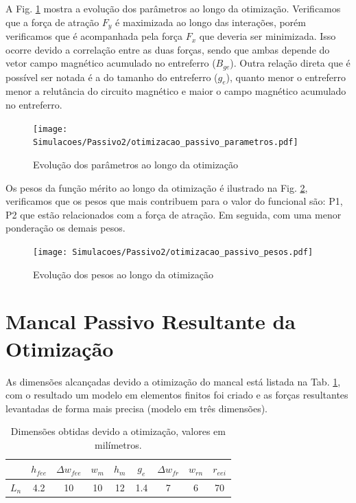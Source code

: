 A Fig. \ref{fig:otimizacao_passivo_parametros} mostra a evolução dos parâmetros ao longo da otimização. Verificamos que a força de atração $F_y$ é maximizada ao longo das interações, porém verificamos que é acompanhada pela força $F_x$ que deveria ser minimizada. Isso ocorre devido a correlação entre as duas forças, sendo que ambas depende do vetor campo magnético acumulado no entreferro ($B_{ge}$). Outra relação direta que é possível ser notada é a do tamanho do entreferro ($g_e$), quanto menor o entreferro menor a relutância do circuito magnético e maior o campo magnético acumulado no entreferro.


\begin{figure}[bh!]
	\centering
	\texttt{[image: Simulacoes/Passivo2/otimizacao\_passivo\_parametros.pdf]}
	\caption{Evolução dos parâmetros ao longo da otimização}
	\label{fig:otimizacao_passivo_parametros}
\end{figure} 

Os pesos da função mérito ao longo da otimização é ilustrado na Fig. \ref{fig:otimizacao_passivo_pesos}, verificamos que os pesos que mais contribuem para o valor do funcional são: P1, P2 que estão relacionados com a força de atração. Em seguida, com uma menor ponderação os demais pesos. 

\begin{figure}[th!]
	\centering
	\texttt{[image: Simulacoes/Passivo2/otimizacao\_passivo\_pesos.pdf]}
	\caption{Evolução dos pesos ao longo da otimização}
	\label{fig:otimizacao_passivo_pesos}
\end{figure} 

\section{Mancal Passivo Resultante da Otimização}

As dimensões alcançadas devido a otimização do mancal está listada na Tab. \ref{tab:passivo:dimensoes:otimizado}, com o resultado um modelo em elementos finitos foi criado e as forças resultantes levantadas de forma mais precisa (modelo em três dimensões).

\begin{table}[ht!]
	\centering
	\begin{tabular}{c c c c c c c c c}
		& $h_{fee}$ &$\Delta w_{fee}$ & $w_m$ & $h_m$  & $g_e$ & $\Delta w_{fr}$ & $w_{rn}$ & $r_{eei}$ \\ \hline \hline
		$L_{n}$  	&  4.2 &   10 &   10 &    12 &   1.4 &  7 &   6 &    70 \\
	\end{tabular} 
	\caption{Dimensões obtidas devido a otimização, valores em milímetros.}
	\label{tab:passivo:dimensoes:otimizado} 
\end{table}

